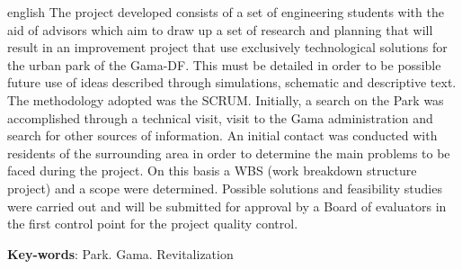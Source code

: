 \begin{resumo}[Abstract]
 \begin{otherlanguage*}{english}
The project developed consists of a set of engineering students with the aid of advisors which aim to draw up a set of research and planning that will result in an improvement project that use exclusively technological solutions for the urban park of the Gama-DF. This must be detailed in order to be possible future use of ideas described through simulations, schematic and descriptive text. The methodology adopted was the SCRUM. Initially, a search on the Park was accomplished through a technical visit, visit to the Gama administration and search for other sources of information.  An initial contact was conducted with residents of the surrounding area in order to determine the main problems to be faced during the project. On this basis a WBS (work breakdown structure project) and a scope were determined. Possible solutions and feasibility studies were carried out and will be submitted for approval by a Board of evaluators in the first control point for the project quality control.

\vspace{\onelineskip}
 
\noindent 
\textbf{Key-words}: Park. Gama. Revitalization
\end{otherlanguage*}
\end{resumo}
